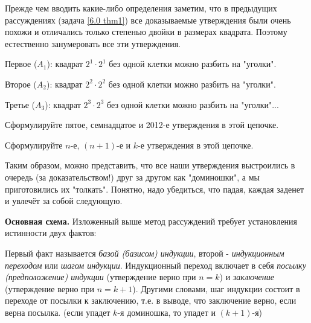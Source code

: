 Прежде чем вводить какие-либо определения заметим, что в предыдущих рассуждениях (задача \ref{6.0 thm1}) все доказываемые утверждения были очень похожи и отличались только степенью двойки в размерах квадрата. Поэтому естественно занумеровать все эти утверждения. 
\par
Первое ($A_1$): квадрат $2^1 \cdot 2^1$ без одной клетки можно разбить на "уголки". 
\par
Второе ($A_2$): квадрат $2^2 \cdot 2^2$ без одной клетки можно разбить на "уголки". 
\par
Третье ($A_3$): квадрат $2^3 \cdot 2^3$ без одной клетки можно разбить на "уголки"...

\begin{ex}
Сформулируйте пятое, семнадцатое и 2012-е утверждения в этой цепочке.
\end{ex}

\begin{ex}
Сформулируйте $n$-е, $(n+1)$-е и $k$-е утверждения в этой цепочке.
\end{ex}

Таким образом, можно представить, что все наши утверждения выстроились в очередь (за доказательством!) друг за другом как "доминошки", а мы приготовились их "толкать". Понятно, надо убедиться, что падая, каждая заденет и увлечёт за собой следующую.

\newpage

\textbf{Основная схема.} Изложенный выше метод рассуждений требует установления истинности двух фактов:


Первый факт называется \textit{базой (базисом) индукции}, второй - \textit{индукционным переходом} или \textit{шагом индукции}. Индукционный переход включает в себя \textit{посылку (предположение) индукции} (утверждение верно при $n = k$) и \textit{заключение} (утверждение верно при $n = k + 1$). Другими словами, шаг индукции состоит в переходе от посылки к заключению, т.е. в выводе, что заключение верно, если верна посылка. (если упадет $k$-я
доминошка, то упадет и $(k+1)$-я) 

